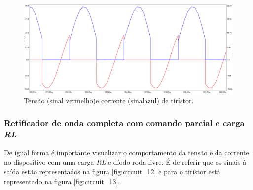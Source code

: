 \documentclass[a4paper,11pt]{article}
\numberwithin{equation}{section}
\begin{document}
\begin{figure}[h]
	\centering
	\includegraphics[keepaspectratio=true, scale=0.4]{img/circuito9}
	\caption{Tensão (sinal vermelho)e corrente (sinalazul) de tirístor.}
	\label{fig:circuit_11}
	\vspace{-0.8em}
\end{figure}

\vspace{12mm}


\subsubsection{Retificador de onda completa com comando parcial e carga \textit{RL}}
De igual forma é importante visualizar o comportamento da tensão e da corrente no dispositivo com uma carga \textit{RL} e díodo roda livre. É de referir que os sinais à saída estão representados na figura \ref{fig:circuit_12} e para o tirístor está representado na figura \ref{fig:circuit_13}.
\end{document}
